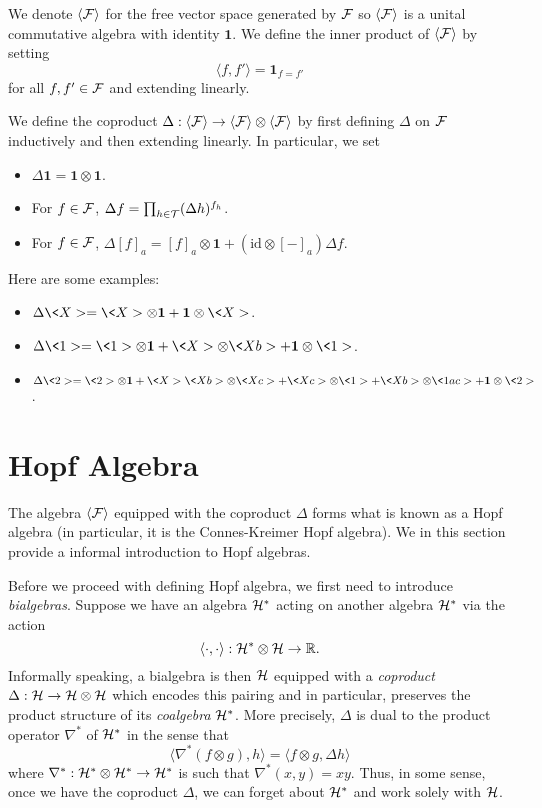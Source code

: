 \documentclass[11pt]{style/preprint}
\begin{document}
We denote \(\langle {\mathcal F} \rangle\) for the free vector space generated by \({\mathcal F}\) so \(\langle {\mathcal F}\rangle\) 
is a unital commutative algebra with identity \(\mathbf{1}\). We define the inner product of \(\langle {\mathcal F} \rangle\)
by setting 
\begin{equation}\label{eq:inner-product}
  \langle f, f'\rangle = \mathbf{1}_{f = f'}
\end{equation}
for all \(f, f' \in {\mathcal F}\) and extending linearly. 

We define the coproduct \(\Delta : \langle {\mathcal F} \rangle \to \langle {\mathcal F} \rangle \otimes \langle {\mathcal F} \rangle\) 
by first defining \(\Delta\) on \({\mathcal F}\) inductively and then extending linearly. In particular, we set
\begin{itemize}
  \item \(\Delta \mathbf{1} = \mathbf{1} \otimes \mathbf{1}\).
  \item For \(f \in {\mathcal F}\), \(\Delta f = \prod_{h \in {\mathcal T}} (\Delta h)^{f_h}\).
  \item For \(f \in {\mathcal F}\), \(\Delta [f]_a = [f]_a \otimes \mathbf{1} + (\text{id} \otimes [-]_a) \Delta f\).
\end{itemize} 
Here are some examples:
\begin{itemize}
  \item \(\Delta \<X> = \<X> \otimes \mathbf{1} + \mathbf{1} \otimes \<X>\).
  \item \(\Delta \<1> = \<1> \otimes \mathbf{1} + \<X> \otimes \<Xb> + \mathbf{1} \otimes \<1>\).
  \item \(\Delta \<2> = \<2> \otimes \mathbf{1} + \<X> \<Xb> \otimes \<Xc> + \<Xc> \otimes \<1> 
    + \<Xb> \otimes \<1ac> + \mathbf{1} \otimes \<2>\).
\end{itemize}

\section{Hopf Algebra}

The algebra \(\langle {\mathcal F}\rangle\) equipped with the coproduct \(\Delta\) forms what is known as a 
Hopf algebra (in particular, it is the Connes-Kreimer Hopf algebra). We in this section provide a 
informal introduction to Hopf algebras.

Before we proceed with defining Hopf algebra, we first need to introduce \textit{bialgebras}.
Suppose we have an algebra \({\mathcal H}^*\) acting on another algebra \({\mathcal H}^*\) via the action 
\[\langle \cdot, \cdot \rangle : {\mathcal H}^* \otimes {\mathcal H} \to \mathbb{R}.\]
Informally speaking, a bialgebra is then \({\mathcal H}\) equipped with a \textit{coproduct} \(\Delta : {\mathcal H} \to {\mathcal H} \otimes {\mathcal H}\) 
which encodes this pairing and in particular, preserves the product structure of its \textit{coalgebra} \({\mathcal H}^*\). More precisely,
\(\Delta\) is dual to the product operator \(\nabla^*\) of \({\mathcal H}^*\) in the sense that 
\[\langle \nabla^*(f \otimes g), h\rangle = \langle f \otimes g, \Delta h\rangle\]
where \(\nabla^* : {\mathcal H}^* \otimes {\mathcal H}^* \to {\mathcal H}^*\) is such that \(\nabla^*(x, y) = xy\). Thus, in some 
sense, once we have the coproduct \(\Delta\), we can forget about \({\mathcal H}^*\) and work solely with \({\mathcal H}\).
\end{document}
